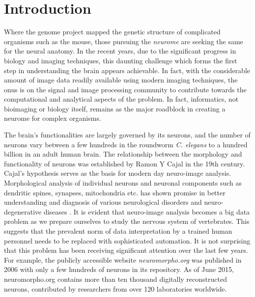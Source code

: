 
\chapter{Introduction} %

\label{Chapter1} %



Where the genome project mapped the genetic structure of complicated organisms such as the mouse, those pursuing the \textit{neurome} are seeking the same for the neural anatomy. In the recent years, due to the significant progress in biology and imaging techniques, this daunting challenge which forms the first step in understanding the brain appears achievable. In fact, with the considerable amount of image data readily available using modern imaging techniques, the onus is on the signal and image processing community to contribute towards the computational and analytical aspects of the problem. In fact, informatics, not bioimaging or biology itself, remains as the major roadblock in creating a neurome for complex organisms.  

The brain’s functionalities are largely governed by its neurons, and the number of neurons vary between a few hundreds in the roundworm \textit{C. elegans}\cite{cElegans} to a hundred billion in an adult human brain. The relationship between the morphology and functionality of neurons was established by Ramon Y Cajal in the 19th century. Cajal’s hypothesis serves as the basis for modern day neuro-image analysis. Morphological analysis of individual neurons and neuronal components such as dendritic spines, synapses, mitochondria etc. has shown promise in better understanding and diagnosis of various neurological disorders and neuro-degenerative diseases \cite{bio_belichenko1994rett,neuron_structure,barry_serotonergic,barry_branching,cuntz_neuron}. It is evident that neuro-image analysis becomes a big data problem as we prepare ourselves to study the nervous system of vertebrates. This suggests that the prevalent norm of data interpretation by a trained human personnel needs to be replaced with sophisticated automation. It is not surprising that this problem has been receiving significant attention over the last few years. For example, the publicly accessible website \textit{neuromorpho.org} \cite{neuromorpho} was published in 2006 with only a few hundreds of neurons in its repository. As of June 2015, neuromorpho.org contains more than ten thousand digitally reconstructed neurons, contributed by researchers from over 120 laboratories worldwide.

